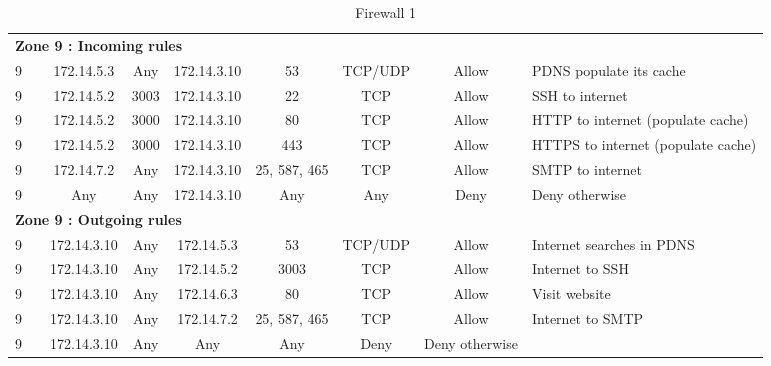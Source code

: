 \documentclass[a4paper,titlepage]{article}
\begin{document}
\begin{landscape}
\begin{table}[h]
\begin{tabular}{c|c|cc|cc|ccl}
			\hline
			\multicolumn{9}{l}{\textbf{Zone 9 : Incoming rules}}\\
			9 &  & 172.14.5.3 & Any & 172.14.3.10 & 53 & TCP/UDP & Allow & PDNS populate its cache\\
			9 &  & 172.14.5.2 & 3003 & 172.14.3.10 & 22 & TCP & Allow & SSH to internet\\
			9 &  & 172.14.5.2 & 3000 & 172.14.3.10 & 80 & TCP & Allow & HTTP to internet (populate cache)\\
			9 &  & 172.14.5.2 & 3000 & 172.14.3.10 & 443 & TCP & Allow & HTTPS to internet (populate cache)\\
			9 &  & 172.14.7.2 & Any & 172.14.3.10 & 25, 587, 465 & TCP & Allow & SMTP to internet\\
			9 &  & Any & Any & 172.14.3.10 & Any & Any & Deny & Deny otherwise\\

			\hline
			\multicolumn{9}{l}{\textbf{Zone 9 : Outgoing rules}}\\
			9 &  & 172.14.3.10 & Any & 172.14.5.3 & 53 & TCP/UDP & Allow & Internet searches in PDNS\\
			9 &  & 172.14.3.10 & Any & 172.14.5.2 & 3003 & TCP & Allow & Internet to SSH\\
			9 &  & 172.14.3.10 & Any & 172.14.6.3 & 80 & TCP & Allow & Visit website\\
			9 &  & 172.14.3.10 & Any & 172.14.7.2 & 25, 587, 465 & TCP & Allow & Internet to SMTP\\
			9 &  & 172.14.3.10 & Any & Any & Any & Deny & Deny otherwise


		\end{tabular}
		\caption{Firewall 1}
	\end{table}
	\vspace*{\fill}
\end{landscape}


\end{document}
